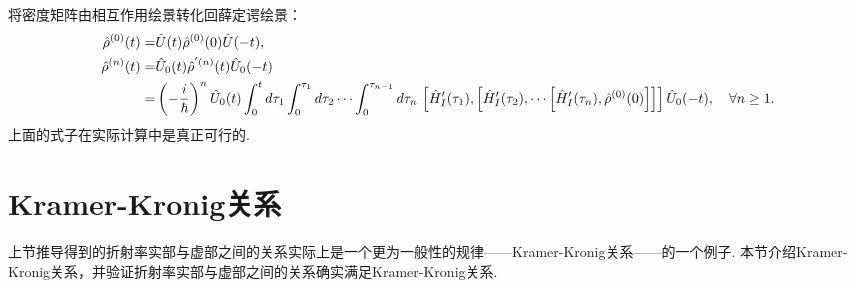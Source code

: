 \documentclass{assignment}
\begin{document}
将密度矩阵由相互作用绘景转化回薛定谔绘景：
\begin{align}
    \hat{\rho}^{(0)}(t)=&\hat{U}(t)\hat{\rho}^{(0)}(0)\hat{U}(-t),\\
    \notag\hat{\rho}^{(n)}(t)=&\hat{U}_0(t)\hat{\rho}^{'(n)}(t)\hat{U}_0(-t)\\
    =&\left(-\frac{i}{\hbar}\right)^n\hat{U}_0(t)\int_0^td\tau_1\int_0^{\tau_1}d\tau_2\cdots\int_0^{\tau_{n-1}}d\tau_n\,\left[\hat{H}_I'(\tau_1),\left[\hat{H}_I'(\tau_2),\cdots\left[\hat{H}_I'(\tau_n),\hat{\rho}^{(0)}(0)\right]\right]\right]\hat{U}_0(-t),\quad\forall n\geq 1.
\end{align}
上面的式子在实际计算中是真正可行的.

\section{Kramer-Kronig关系}
上节推导得到的折射率实部与虚部之间的关系实际上是一个更为一般性的规律——Kramer-Kronig关系——的一个例子. 本节介绍Kramer-Kronig关系，并验证折射率实部与虚部之间的关系确实满足Kramer-Kronig关系.
\end{document}
